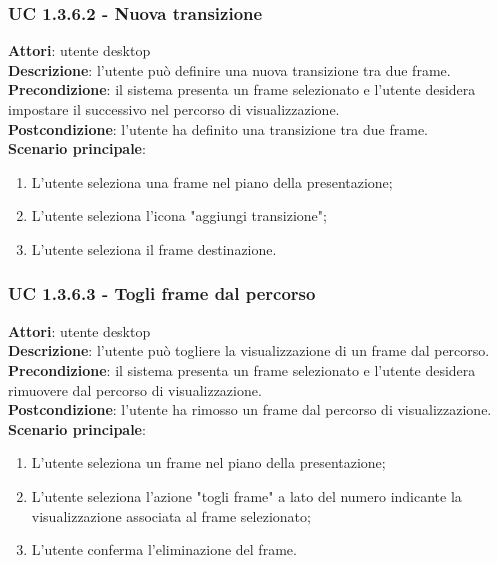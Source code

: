 \subsubsection{UC 1.3.6.2 - Nuova transizione}{
	\label{uc1.3.6.2}
	\textbf{Attori}: utente desktop \\
	\textbf{Descrizione}: l'utente può definire una nuova transizione tra due frame. \\
	\textbf{Precondizione}: il sistema presenta un frame selezionato e l'utente desidera impostare il successivo nel percorso di visualizzazione.	\\
	\textbf{Postcondizione}: l'utente ha definito una transizione tra due frame.	\\
	\textbf{Scenario principale}:
	\begin{enumerate}
		\item L'utente seleziona una frame nel piano della presentazione;
		\item L'utente seleziona l'icona "aggiungi transizione";
		\item L'utente seleziona il frame destinazione.
	\end{enumerate}
}
\subsubsection{UC 1.3.6.3 - Togli frame dal percorso}{
	\label{uc1.3.6.3}
	\textbf{Attori}: utente desktop \\
	\textbf{Descrizione}: l'utente può togliere la visualizzazione di un frame dal percorso. \\
	\textbf{Precondizione}: il sistema presenta un frame selezionato e l'utente desidera rimuovere dal percorso di visualizzazione.	\\
	\textbf{Postcondizione}: l'utente ha rimosso un frame dal percorso di visualizzazione.	\\
	\textbf{Scenario principale}:
	\begin{enumerate}
		\item L'utente seleziona un frame nel piano della presentazione;
		\item L'utente seleziona l'azione "togli frame" a lato del numero indicante la visualizzazione associata al frame selezionato;
		\item L'utente conferma l'eliminazione del frame.
	\end{enumerate}
}
